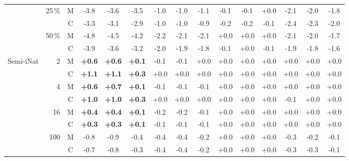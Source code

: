\begin{table}[tbp]
\begin{tabular}{@{}l r c@{\hspace{4pt}} *{12}{S[table-format=+1.1, retain-explicit-plus]}@{}}
 & 25\,\% & M & -3.8 & -3.6 & -3.5 & -1.0 & -1.0 & -1.1 & -0.1 & -0.1 & +0.0 & -2.1 & -2.0 & -1.8 \\
 &  & C & -3.3 & -3.1 & -2.9 & -1.0 & -1.0 & -0.9 & -0.2 & -0.2 & -0.1 & -2.4 & -2.3 & -2.0 \\
 & 50\,\% & M & -4.8 & -4.5 & -4.2 & -2.2 & -2.1 & -2.1 & +0.0 & +0.0 & +0.0 & -2.1 & -2.0 & -1.7 \\
 &  & C & -3.9 & -3.6 & -3.2 & -2.0 & -1.9 & -1.8 & -0.1 & +0.0 & -0.1 & -1.9 & -1.8 & -1.6 \\
\addlinespace
Semi-iNat & 2 & M & \bfseries +0.6 & \bfseries +0.6 & \bfseries +0.1 & -0.1 & -0.1 & +0.0 & +0.0 & +0.0 & +0.0 & +0.0 & +0.0 & +0.0 \\
 &  & C & \bfseries +1.1 & \bfseries +1.1 & \bfseries +0.3 & +0.0 & +0.0 & +0.0 & +0.0 & +0.0 & +0.0 & +0.0 & +0.0 & +0.0 \\
 & 4 & M & \bfseries +0.6 & \bfseries +0.7 & \bfseries +0.1 & -0.1 & -0.1 & -0.1 & +0.0 & +0.0 & +0.0 & +0.0 & +0.0 & +0.0 \\
 &  & C & \bfseries +1.0 & \bfseries +1.0 & \bfseries +0.3 & +0.0 & +0.0 & +0.0 & +0.0 & +0.0 & +0.0 & -0.1 & +0.0 & +0.0 \\
 & 16 & M & \bfseries +0.4 & \bfseries +0.4 & \bfseries +0.1 & -0.2 & -0.2 & -0.1 & +0.0 & +0.0 & +0.0 & +0.0 & +0.0 & +0.0 \\
 &  & C & \bfseries +0.3 & \bfseries +0.3 & \bfseries +0.1 & -0.1 & -0.1 & -0.1 & +0.0 & +0.0 & +0.0 & +0.0 & +0.0 & +0.0 \\
 & 100 & M & -0.8 & -0.9 & -0.4 & -0.4 & -0.4 & -0.2 & +0.0 & +0.0 & +0.0 & -0.3 & -0.2 & -0.1 \\
 &  & C & -0.7 & -0.8 & -0.3 & -0.4 & -0.4 & -0.2 & +0.0 & +0.0 & +0.0 & -0.3 & -0.3 & -0.1 \\
\bottomrule
\end{tabular}
\end{table}
